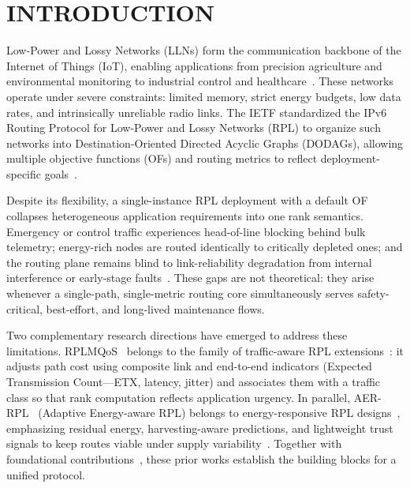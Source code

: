 \section{INTRODUCTION}
\label{sec:intro}

Low-Power and Lossy Networks (LLNs) form the communication backbone of the Internet of Things (IoT), enabling applications from precision agriculture and environmental monitoring to industrial control and healthcare~\cite{rfc6550,rfc8200,rfc4944}. These networks operate under severe constraints: limited memory, strict energy budgets, low data rates, and intrinsically unreliable radio links. The IETF standardized the IPv6 Routing Protocol for Low-Power and Lossy Networks (RPL) to organize such networks into Destination-Oriented Directed Acyclic Graphs (DODAGs), allowing multiple objective functions (OFs) and routing metrics to reflect deployment-specific goals~\cite{rfc6550,rfc6551,gaddour2012rplsurvey}.

Despite its flexibility, a single-instance RPL deployment with a default OF collapses heterogeneous application requirements into one rank semantics. Emergency or control traffic experiences head-of-line blocking behind bulk telemetry; energy-rich nodes are routed identically to critically depleted ones; and the routing plane remains blind to link-reliability degradation from internal interference or early-stage faults~\cite{rfc7416}. These gaps are not theoretical: they arise whenever a single-path, single-metric routing core simultaneously serves safety-critical, best-effort, and long-lived maintenance flows.

Two complementary research directions have emerged to address these limitations. RPLMQoS~\cite{belacel2025rplmqos} belongs to the family of traffic-aware RPL extensions~\cite{nassar2018qosrpl,solapure2024rplofs,wakili2024mlrpl}: it adjusts path cost using composite link and end-to-end indicators (Expected Transmission Count---ETX, latency, jitter) and associates them with a traffic class so that rank computation reflects application urgency. In parallel, AER-RPL~\cite{belacel2025aerrpl} (Adaptive Energy-aware RPL) belongs to energy-responsive RPL designs~\cite{lamaazi2018energyrpl,limjoco2018analytical,wang2024drplcomnet,poornima2025fuzzyclrpl}, emphasizing residual energy, harvesting-aware predictions, and lightweight trust signals to keep routes viable under supply variability~\cite{farooq2022trustrpl,pishdar2021pccrpl}. Together with foundational contributions~\cite{bhandari2020multitopology}, these prior works establish the building blocks for a unified protocol.

